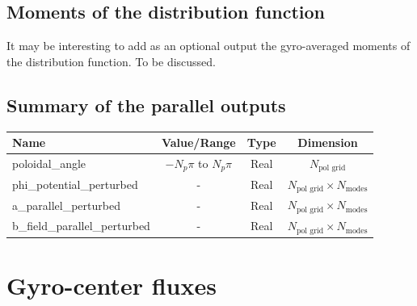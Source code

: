 \documentclass[fleqn]{report}
\begin{document}
\subsection{Moments of the distribution function}
It may be interesting to add as an optional output the gyro-averaged moments of the distribution function. To be discussed.

\subsection{Summary of the parallel outputs}
\begin{tabularx}{\textwidth}{|L|S|S|S|}
\hline
Name & Value/Range & Type & Dimension \\
\hline
poloidal\_angle & $-N_p\pi$ to $N_p\pi$ & Real & $N_\textrm{pol grid}$\\
phi\_potential\_perturbed & - & Real & $N_\textrm{pol grid}\times N_\textrm{modes}$\\
a\_parallel\_perturbed & - & Real & $N_\textrm{pol grid}\times N_\textrm{modes}$\\
b\_field\_parallel\_perturbed & - & Real & $N_\textrm{pol grid}\times N_\textrm{modes}$\\ 
\hline
\end{tabularx}


\section{Gyro-center fluxes}
\end{document}
